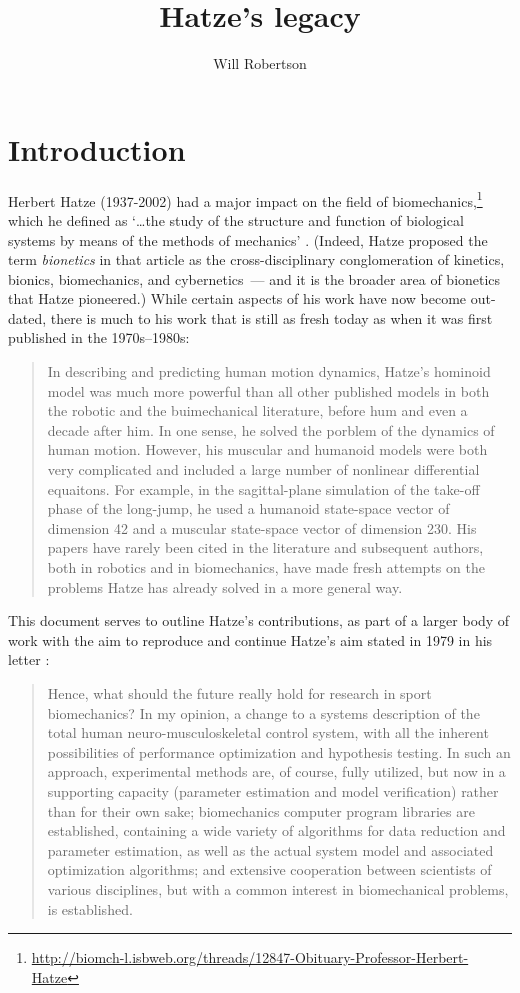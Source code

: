 \documentclass[a4paper]{article}
\begin{document}
\title{Hatze's legacy}
\author{Will Robertson}
\maketitle

\section{Introduction}

Herbert Hatze (1937-2002) had a major impact on the field of biomechanics,\footnote{\url{http://biomch-l.isbweb.org/threads/12847-Obituary-Professor-Herbert-Hatze}}
which he defined as `\dots the study of the structure and function of biological systems by means of the methods of mechanics' \parencite{hatze1974-biomech}.
(Indeed, Hatze proposed the term \emph{bionetics} in that article as the cross-disciplinary conglomeration of kinetics, bionics, biomechanics, and cybernetics~--- and it is the broader area of bionetics that Hatze pioneered.)
While certain aspects of his work have now become out-dated, there is much to his work that is still as fresh today as when it was first published in the 1970s--1980s:
\begin{quote}
In describing and predicting human motion dynamics, Hatze's hominoid model was much more powerful than all other published models in both the robotic and the buimechanical literature, before hum and even a decade after him. In one sense, he solved the porblem of the dynamics of human motion. However, his muscular and humanoid models were both very complicated and included a large number of nonlinear differential equaitons. For example, in the sagittal-plane simulation of the take-off phase of the long-jump, he used a humanoid state-space vector of dimension 42 and a muscular state-space vector of dimension 230. His papers have rarely been cited in the literature and subsequent authors, both in robotics and in biomechanics, have made fresh attempts on the problems Hatze has already solved in a more general way. \cite{ivancevic2005-natbio}
\end{quote}
This document serves to outline Hatze's contributions, as part of a larger body of work with the aim to reproduce and continue Hatze's aim stated in 1979 in his letter  \parencite{hatze1979-biomech-letter}:
\begin{quote}
Hence, what should the future really hold for research in 
sport biomechanics? In my opinion, a change to a systems 
description of the total human neuro-musculoskeletal control 
system, with all the inherent possibilities of performance 
optimization and hypothesis testing. In such an approach, 
experimental methods are, of course, fully utilized, but now in 
a supporting capacity (parameter estimation and model 
verification) rather than for their own sake; biomechanics 
computer program libraries are established, containing a 
wide variety of algorithms for data reduction and parameter 
estimation, as well as the actual system model and associated 
optimization algorithms; and extensive cooperation between 
scientists of various disciplines, but with a common interest in 
biomechanical problems, is established.
\end{quote}
\end{document}
